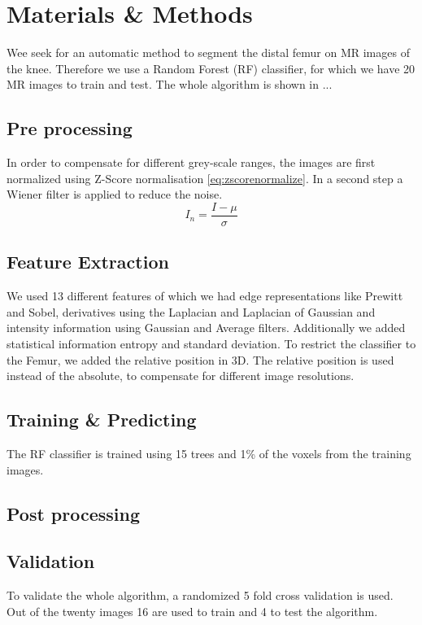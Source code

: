 \section{Materials \& Methods}
Wee seek for an automatic method to segment the distal femur on MR images of the knee. Therefore we use a Random Forest (RF) classifier, for which we have 20 MR images to train and test. The whole algorithm is shown in ...
\subsection{Pre processing}
In order to compensate for different grey-scale ranges, the images are first normalized using Z-Score normalisation \autoref{eq:zscorenormalize}. In a second step a Wiener filter is applied to reduce the noise. 
\begin{equation}
I_n = \frac{I - \mu}{\sigma}
\label{eq:zscorenormalize}
\end{equation}
\subsection{Feature Extraction}
We used 13 different features of which we had edge representations like Prewitt and Sobel, derivatives using the Laplacian and Laplacian of Gaussian and intensity information using Gaussian and Average filters. Additionally we added statistical information entropy and standard deviation. To restrict the classifier to the Femur, we added the relative position in 3D. The relative position is used instead of the absolute, to compensate for different image resolutions.
\subsection{Training \& Predicting}
The RF classifier is trained using 15 trees and 1\% of the voxels from the training images. 
\subsection{Post processing}
\subsection{Validation}
To validate the whole algorithm, a randomized 5 fold cross validation is used. Out of the twenty images 16 are used to train and 4 to test the algorithm. 
